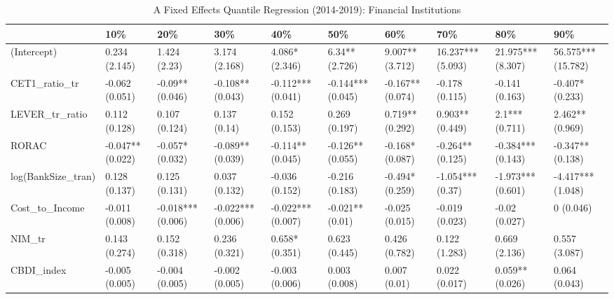\begin{table}[ht]
\centering
\caption{A Fixed Effects Quantile Regression (2014-2019): Financial Institutions} 
\begingroup\small
\begin{tabular}{llllllllll}
  \toprule
 & 10\% & 20\% & 30\% & 40\% & 50\% & 60\% & 70\% & 80\% & 90\% \\ 
  \midrule
(Intercept) & 0.234 (2.145) & 1.424 (2.23) & 3.174 (2.168) & 4.086* (2.346) & 6.34** (2.726) & 9.007** (3.712) & 16.237*** (5.093) & 21.975*** (8.307) & 56.575*** (15.782) \\ 
  CET1\_ratio\_tr & -0.062 (0.051) & -0.09** (0.046) & -0.108** (0.043) & -0.112*** (0.041) & -0.144*** (0.045) & -0.167** (0.074) & -0.178 (0.115) & -0.141 (0.163) & -0.407* (0.233) \\ 
  LEVER\_tr\_ratio & 0.112 (0.128) & 0.107 (0.124) & 0.137 (0.14) & 0.152 (0.153) & 0.269 (0.197) & 0.719** (0.292) & 0.903** (0.449) & 2.1*** (0.711) & 2.462** (0.969) \\ 
  RORAC & -0.047** (0.022) & -0.057* (0.032) & -0.089** (0.039) & -0.114** (0.045) & -0.126** (0.055) & -0.168* (0.087) & -0.264** (0.125) & -0.384*** (0.143) & -0.347** (0.138) \\ 
  log(BankSize\_tran) & 0.128 (0.137) & 0.125 (0.131) & 0.037 (0.132) & -0.036 (0.152) & -0.216 (0.183) & -0.494* (0.259) & -1.054*** (0.37) & -1.973*** (0.601) & -4.417*** (1.048) \\ 
  Cost\_to\_Income & -0.011 (0.008) & -0.018*** (0.006) & -0.022*** (0.006) & -0.022*** (0.007) & -0.021** (0.01) & -0.025 (0.015) & -0.019 (0.023) & -0.02 (0.027) & 0 (0.046) \\ 
  NIM\_tr & 0.143 (0.274) & 0.152 (0.318) & 0.236 (0.321) & 0.658* (0.351) & 0.623 (0.445) & 0.426 (0.782) & 0.122 (1.283) & 0.669 (2.136) & 0.557 (3.087) \\ 
  CBDI\_index & -0.005 (0.005) & -0.004 (0.005) & -0.002 (0.005) & -0.003 (0.006) & 0.003 (0.008) & 0.007 (0.01) & 0.022 (0.017) & 0.059** (0.026) & 0.064 (0.043) \\ 
   \bottomrule
\end{tabular}
\endgroup
\end{table}
